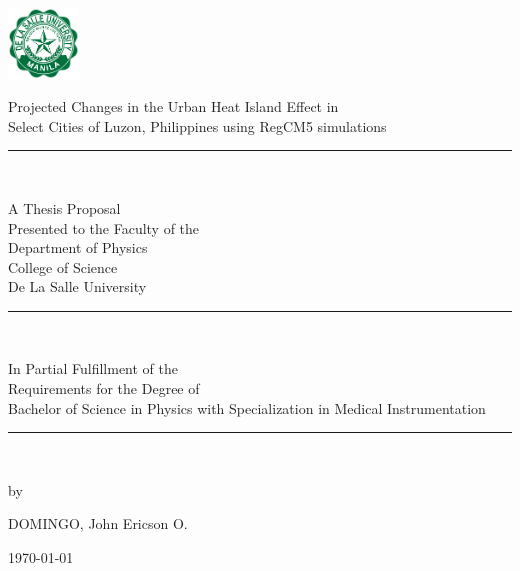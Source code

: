 \begin{center}

	\includegraphics[width=0.14\textwidth]{../format/DLSU_Logo} 
	\vspace{4ex}
	
	\begin{Spacing}{1.5} 
		Projected Changes in the Urban Heat Island Effect in \\
		Select Cities of Luzon, Philippines using RegCM5 simulations \\
	\end{Spacing}
	\vfill
	
	\rule{3cm}{0.5pt}\\
	\vfill
	
	
	A Thesis Proposal\\
	Presented to the Faculty of the \\
	Department of Physics \\
	College of Science \\
	De La Salle University \\
	\vfill
	
	\rule{3cm}{0.5pt}\\
	\vfill
	
	In Partial Fulfillment of the\\
	Requirements for the Degree of\\
	Bachelor of Science in Physics with Specialization in Medical Instrumentation\\
	\vfill
	
	\rule{3cm}{0.5pt}\\
	\vfill
	
	by \\
	\vspace{2.5ex}
	
	DOMINGO, John Ericson O.
	\vspace{2.5ex}
	
	\today \\
\end{center}

\clearpage